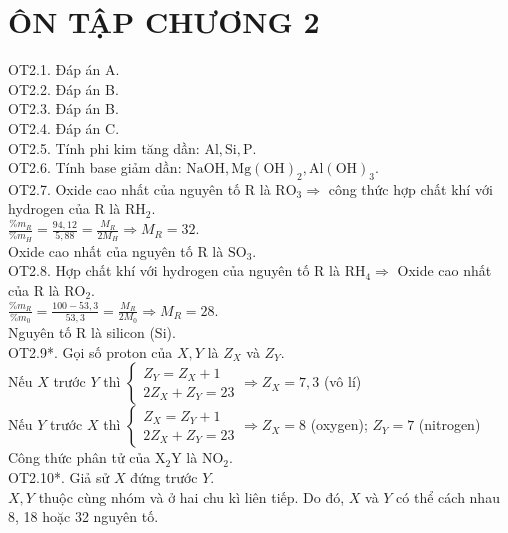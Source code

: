 \documentclass[10pt]{article}
\begin{document}
\section*{ÔN TẬP CHƯƠNG 2}
OT2.1. Đáp án A.\\
OT2.2. Đáp án B.\\
OT2.3. Đáp án B.\\
OT2.4. Đáp án C.\\
OT2.5. Tính phi kim tăng dần: $\mathrm{Al}, \mathrm{Si}, \mathrm{P}$.\\
OT2.6. Tính base giảm dần: $\mathrm{NaOH}, \mathrm{Mg}(\mathrm{OH})_{2}, \mathrm{Al}(\mathrm{OH})_{3}$.\\
OT2.7. Oxide cao nhất của nguyên tố R là $\mathrm{RO}_{3} \Rightarrow$ công thức hợp chất khí với hydrogen của R là $\mathrm{RH}_{2}$.\\
$\frac{\% m_{R}}{\% m_{H}}=\frac{94,12}{5,88}=\frac{M_{R}}{2 M_{H}} \Rightarrow M_{R}=32$.\\
Oxide cao nhất của nguyên tố R là $\mathrm{SO}_{3}$.\\
OT2.8. Hợp chất khí với hydrogen của nguyên tố R là $\mathrm{RH}_{4} \Rightarrow$ Oxide cao nhất của R là $\mathrm{RO}_{2}$.\\
$\frac{\% m_{R}}{\% m_{0}}=\frac{100-53,3}{53,3}=\frac{M_{R}}{2 M_{0}} \Rightarrow M_{R}=28$.\\
Nguyên tố R là silicon (Si).\\
OT2.9*. Gọi số proton của $X, Y$ là $Z_{X}$ và $Z_{Y}$.\\
Nếu $X$ trước $Y$ thì $\left\{\begin{array}{l}Z_{Y}=Z_{X}+1 \\ 2 Z_{X}+Z_{Y}=23\end{array} \Rightarrow Z_{X}=7,3\right.$ (vô lí)\\
Nếu $Y$ trước $X$ thì $\left\{\begin{array}{l}Z_{X}=Z_{Y}+1 \\ 2 Z_{X}+Z_{Y}=23\end{array} \Rightarrow Z_{X}=8\right.$ (oxygen); $Z_{Y}=7$ (nitrogen)\\
Công thức phân tử của $\mathrm{X}_{2} \mathrm{Y}$ là $\mathrm{NO}_{2}$.\\
OT2.10*. Giả sử $X$ đứng trước $Y$.\\
$X, Y$ thuộc cùng nhóm và ở hai chu kì liên tiếp. Do đó, $X$ và $Y$ có thể cách nhau 8, 18 hoặc 32 nguyên tố.\\
\end{document}

